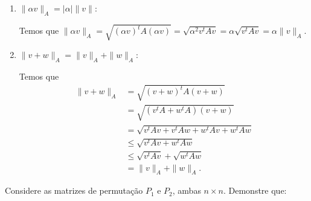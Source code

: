 \documentclass[a4paper,12pt, leqno, answers]{exam}
\begin{document}
\begin{questions}
\begin{solution}
\begin{enumerate}
            \item $\| \alpha v \|_A = | \alpha | \| v \|$:

                Temos que $\| \alpha v \|_A = \sqrt{ \left( \alpha v \right)^t A \left( \alpha v \right) } = \sqrt{\alpha^2 v^t A v} = \alpha \sqrt{v^t A v} = \alpha \| v \|_A$.

            \item $\| v + w \|_A = \| v \|_A + \| w \|_A$:

                Temos que 
                \begin{align*}
                    \| v + w \|_A &= \sqrt{ \left( v + w \right)^t A \left( v + w \right)} \\
                    &= \sqrt{ \left( v^t A + w^t A \right) \left( v + w \right)} \\
                    &= \sqrt{v^t A v + v^t A w + w^t A v + w^t A w} \\
                    &\leq \sqrt{v^t A v + w^t A w} \\
                    &\leq \sqrt{v^t A v} + \sqrt{w^t A w} \\
                    &= \| v \|_A + \| w \|_A.
                \end{align*}
        \end{enumerate}
    \end{solution}

    \question Considere as matrizes de permuta\c{c}\~{a}o $P_1$ e $P_2$, ambas $n \times n$. Demonstre que:
\end{questions}
\end{document}
